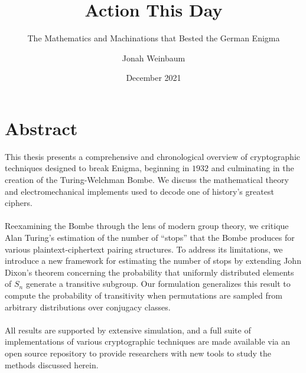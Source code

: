 \documentclass{dcthesis}
\title{Action This Day}
\subtitle{The Mathematics and Machinations that Bested the German Enigma}
\author{Jonah Weinbaum}
\date{December 2021}
\theoremstyle{definition}
\theoremstyle{remark}
\begin{document}
\frontmatter

\maketitle
\restoregeometry


\tableofcontents




\chapter*{Abstract}
This thesis presents a comprehensive and chronological overview of
cryptographic techniques designed to break Enigma, beginning in
$1932$ and culminating in the creation of the Turing-Welchman Bombe.
We discuss the mathematical theory and electromechanical implements
used to decode one of history's greatest ciphers.
\\\\Reexamining the Bombe through the lens of modern group theory, we
critique Alan Turing's estimation of the number of ``stops'' that the
Bombe produces for various plaintext-ciphertext pairing structures.
To address its limitations, we introduce a new framework for
estimating the number of stops by extending John Dixon's theorem
concerning the probability that uniformly distributed elements of
$S_n$ generate a transitive subgroup. Our formulation generalizes
this result to compute the probability of transitivity when
permutations are sampled from arbitrary distributions over conjugacy classes.
\\\\All results are supported by extensive simulation, and a full
suite of implementations of various cryptographic techniques are made
available via an open source repository to provide researchers with
new tools to study the methods discussed herein.
\end{document}
